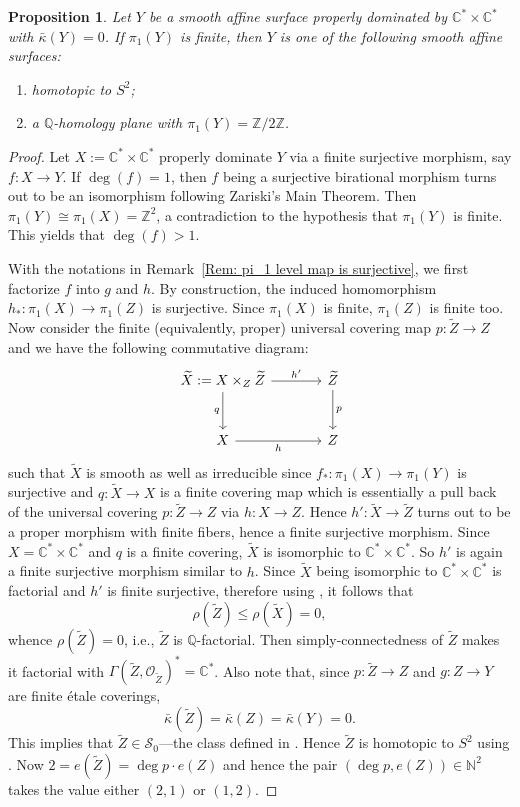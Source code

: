 \documentclass[12pt,reqno,twoside]{amsart}
\newtheorem{prop}[theorem]{Proposition}
\theoremstyle{definition}
\numberwithin{equation}{section}
\newcommand{\C}{\mathbb{C}}
\newcommand{\N}{\mathbb{N}}
\newcommand{\Q}{\mathbb{Q}}
\newcommand{\Z}{\mathbb{Z}}
\newcommand{\Kbar}{\bar{\kappa}}
\newcommand{\wt}{\widetilde}
\begin{document}
\begin{prop}\label{Prop: Affine surface properly dominated by 2-torus and with finite pi_1}
    Let $Y$ be a smooth affine surface properly dominated by $\C^*\times \C^*$ with $\Kbar(Y)=0$. If $\pi_1(Y)$ is finite, then $Y$ is one of the following smooth affine surfaces:
    \begin{enumerate}[\indent\rm(1)]
        \item homotopic to $S^2$;
        \item a $\Q$-homology plane with $\pi_1(Y)=\Z/2\Z$.
    \end{enumerate}
\end{prop}
\begin{proof}
    Let $X:=\C^* \times \C^*$ properly dominate $Y$ via a finite surjective morphism, say $f: X \to Y$. If $\deg(f)=1$, then $f$ being a surjective birational morphism turns out to be an isomorphism following Zariski's Main Theorem. Then $\pi_1(Y) \cong \pi_1(X) = \Z^2$, a contradiction to the hypothesis that $\pi_1(Y)$ is finite. This yields that $\deg(f)>1$. 
 
    With the notations in Remark~\ref{Rem: pi_1 level map is surjective}, we first factorize $f$ into $g$ and $h$. By construction, the induced homomorphism $h_\ast : \pi_1(X) \to \pi_1(Z)$ is surjective. Since $\pi_1(X)$ is finite, $\pi_1(Z)$ is finite too. Now consider the finite (equivalently, proper) universal covering map $p: \wt{Z} \to Z$ and we have the following commutative diagram:
	$$
	\begin{tikzcd}[row sep=large, column sep=large]
	\wt{X}:=X \times_{Z} \wt{Z} \arrow[r, "h'"] \arrow[d, "q"'] &\wt{Z} \arrow[d, "p"]\\
	X \arrow[r, "h"'] & Z
	\end{tikzcd}
	$$
	such that $\wt{X}$ is smooth as well as irreducible since $f_\ast: \pi_1(X) \to \pi_1(Y)$ is surjective and $q: \wt{X} \to X$ is a finite covering map which is essentially a pull back of the universal covering $p: \wt{Z} \to Z$ via $h: X \to Z$. Hence $h': \wt{X} \to \wt{Z}$ turns out to be a proper morphism with finite fibers, hence a finite surjective morphism. Since $X=\C^* \times \C^*$ and $q$ is a finite covering, $\wt{X}$ is isomorphic to $\C^* \times \C^*$. So $h'$ is again a finite surjective morphism similar to $h$. Since $\wt{X}$ being isomorphic to $\C^*\times \C^*$ is factorial and $h'$ is finite surjective, therefore using \cite{GMM2021}, it follows that $$\rho(\wt{Z})\leq \rho(\wt{X})=0,$$ whence $\rho(\wt{Z})=0$, i.e., $\wt{Z}$ is $\Q$-factorial. Then simply-connectedness of $\wt{Z}$ makes it factorial with $\Gamma(\wt{Z},\mathcal{O}_{\wt{Z}})^*=\C^*$. Also note that, since $p:\wt{Z} \to Z$ and $g:Z\to Y$ are finite {\'e}tale coverings, $$\Kbar(\wt{Z})=\Kbar(Z)=\Kbar(Y)=0.$$ This implies that $\wt{Z}\in \mathcal{S}_0$---the class defined in \cite{JSXZ2024}. Hence $\wt{Z}$ is homotopic to $S^2$ using \cite[Theorem 4.2]{JSXZ2024}. Now $2=e(\wt{Z})=\deg p\cdot e(Z)$ and hence the pair $(\deg p, e(Z))\in \N^2$ takes the value either $(2,1)$ or $(1,2)$. 


\end{proof}
\end{document}

